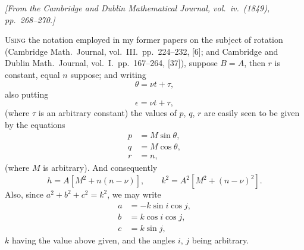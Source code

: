 \documentclass[11pt,a4paper]{book}
\begin{document}
\begin{flushright}
\textit{[From the Cambridge and Dublin Mathematical Journal, vol.\ iv.\ (1849), pp.\ 268--270.]}
\end{flushright}

\setcounter{page}{462}

\textsc{Using} the notation employed in my former papers on the subject of rotation (Cambridge Math.\ Journal, vol.~III.\ pp.~224--232, [6]; and Cambridge and Dublin Math.\ Journal, vol.~I.\ pp.~167--264, [37]), suppose $B = A$, then $r$ is constant, equal $n$ suppose; and writing
\[
\theta = \nu t + \tau,
\]
also putting
\[
\epsilon = \nu t + \tau,
\]
(where $\tau$ is an arbitrary constant) the values of $p$, $q$, $r$ are easily seen to be given by the equations
\begin{align*}
p &= M\sin\theta, \\
q &= M\cos\theta, \\
r &= n,
\end{align*}
(where $M$ is arbitrary). And consequently
\[
h = A[M^{2} + n(n - \nu)], \qquad k^{2} = A^{2}[M^{2} + (n - \nu)^{2}].
\]
Also, since $a^{2} + b^{2} + c^{2} = k^{2}$, we may write
\begin{align*}
a &= -k\sin i\cos j, \\
b &= k\cos i\cos j, \\
c &= k\sin j,
\end{align*}
$k$ having the value above given, and the angles $i$, $j$ being arbitrary.

\newpage

\setcounter{page}{463}
\end{document}
